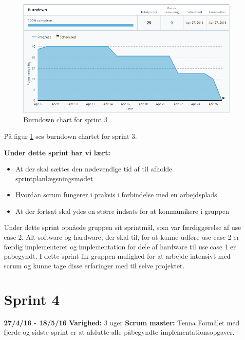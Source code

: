 	\begin{figure}[H]
		\centering
		\includegraphics[width=\textwidth]{Projektgennemfoerelse/images/burndown3}
		\caption{Burndown chart for sprint 3}
		\label{ref:Burndown3}
	\end{figure}
	
	På figur \ref{ref:Burndown3} ses burndown chartet for sprint 3.
	
	\textbf{Under dette sprint har vi lært:}
	\begin{itemize}
		\item At der skal sættes den nødevendige tid af til afholde sprintplanlægsningsmødet
		\item Hvordan scrum fungerer i praksis i forbindelse med en arbejdsplads
		\item At der fortsat skal ydes en større indsats for at kommunikere i gruppen
	\end{itemize}
	
	Under dette sprint opnåede gruppen sit sprintmål, som var færdiggørelse af use case 2. Alt software og hardware, der skal til, for at kunne udføre use case 2 er færdig implementeret og implementation for dele af hardware til use case 1 er påbegyndt. I dette sprint fik gruppen mulighed for at arbejde intensivt med scrum og kunne tage disse erfaringer med til selve projektet. 

	\section{Sprint 4}
	\textbf{27/4/16 - 18/5/16}\newline
	\textbf{Varighed: }3 uger \newline
	\textbf{Scrum master: }Tenna \newline
	Formålet med fjerde og sidste sprint er at afslutte alle påbegyndte implementationsopgaver. 
	
